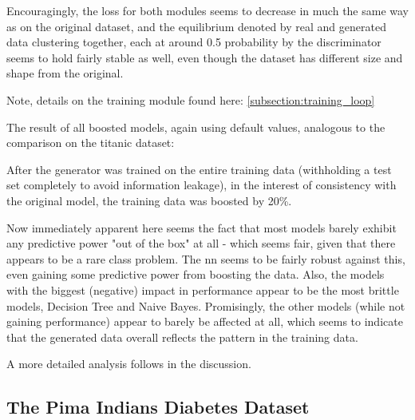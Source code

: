 
\pagebreak

Encouragingly, the loss for both modules seems to decrease in much the same way as on the original dataset, and the equilibrium denoted by real and generated data clustering together, each at around 0.5 probability by the discriminator seems to hold fairly stable as well, even though the dataset has different size and shape from the original.

Note, details on the training module found here: \ref{subsection:training_loop}

The result of all boosted models, again using default values, analogous to the comparison on the titanic dataset:

\pagebreak


\pagebreak

After the generator was trained on the entire training data (withholding a test set completely to avoid information leakage), in the interest of consistency with the original model, the training data was boosted by 20\%.

Now immediately apparent here seems the fact that most models barely exhibit any predictive power "out of the box" at all - which seems fair, given that there appears to be a rare class problem. 
The \ac{nn} seems to be fairly robust against this, even gaining some predictive power from boosting the data. 
Also, the models with the biggest (negative) impact in performance appear to be the most brittle models, Decision Tree and Naive Bayes. 
Promisingly, the other models (while not gaining performance) appear to barely be affected at all, which seems to indicate that the generated data overall reflects the pattern in the training data.

A more detailed analysis follows in the discussion.

\clearpage

\subsection{The Pima Indians Diabetes Dataset}
\label{subsection:pima}

